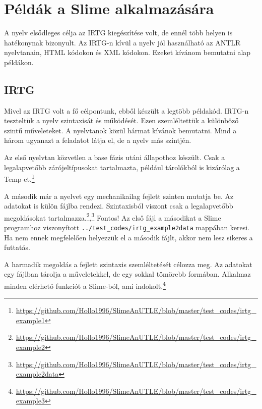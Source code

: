 {%
\section{Példák a Slime alkalmazására}
\label{sec:SExamples}

A nyelv elsődleges célja az IRTG kiegészítése volt, de ennél több helyen is hatékonynak bizonyult.
Az IRTG-n kívül a nyelv jól használható az ANTLR nyelvtanain, HTML kódokon és XML kódokon.
Ezeket kívánom bemutatni alap példákon.


\subsection{IRTG}
\label{sec:SEIRTG}
Mivel az IRTG volt a fő célpontunk, ebből készült a legtöbb példakód.
IRTG-n teszteltük a nyelv szintaxisát és működését.
Ezen szemléltettük a különböző szintű műveleteket.
A nyelvtanok közül hármat kívánok bemutatni.
Mind a három ugyanazt a feladatot látja el, de a nyelv más szintjén.

Az első nyelvtan közvetlen a base fázis utáni állapothoz készült.
Csak a legalapvetőbb zárójeltípusokat tartalmazta, például tárolókból is kizárólag a Temp-et.\footnote{\url{https://github.com/Hollo1996/SlimeAnUTLE/blob/master/test_codes/irtg_example1}}

A második már a nyelvet egy mechanikailag fejlett szinten mutatja be.
Az adatokat is külön fájlba rendezi.
Szintaxisból viszont csak a legalapvetőbb megoldásokat tartalmazza.\footnote{\url{https://github.com/Hollo1996/SlimeAnUTLE/blob/master/test_codes/irtg_example2}},\footnote{\url{https://github.com/Hollo1996/SlimeAnUTLE/blob/master/test_codes/irtg_example2data}}
Fontos! Az első fájl a másodikat a Slime programhoz viszonyított \texttt{../test\_codes/irtg\_example2data} mappában keresi.
Ha nem ennek megfelelően helyezzük el a második fájlt, akkor nem lesz sikeres a futtatás.

A harmadik megoldás a fejlett szintaxis szemléltetését célozza meg.
Az adatokat egy fájlban tárolja a műveletekkel, de egy sokkal tömörebb formában.
Alkalmaz minden elérhető funkciót a Slime-ból, ami indokolt.\footnote{\url{https://github.com/Hollo1996/SlimeAnUTLE/blob/master/test_codes/irtg_example3}}

}

